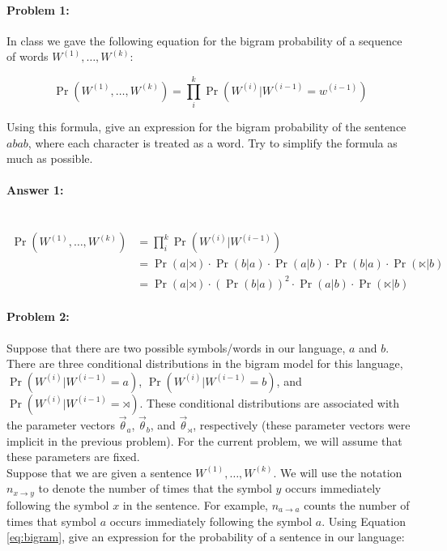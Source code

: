 \documentclass[12pt, letterpaper]{article}
\begin{document}
\pagestyle{fancy}
\paragraph{Problem 1:}
 
In class we gave the following equation for the bigram probability of
a sequence of words $W^{(1)},\dots,W^{(k)}$:

\begin{equation}\label{eq:bigram}
\Pr(W^{(1)},\dots,W^{(k)})=\prod_i^k \Pr(W^{(i)} | W^{(i-1)}=w^{(i-1)})
\end{equation}

\noindent Using this formula, give an expression for the bigram
probability of the sentence $abab$, where each character is treated as
a word. Try to simplify the formula as much as possible.

\paragraph{Answer 1:}~
\begin{align*}
    \Pr(W^{(1)},\dots,W^{(k)})&=\prod_i^k \Pr(W^{(i)} | W^{(i-1)})\\
    &= \Pr(a | \rtimes)\cdot{\Pr(b | a)\cdot{\Pr(a | b)\cdot{\Pr(b | a)\cdot \Pr(\ltimes|b)}}}\\
    &= \Pr(a|\rtimes)\cdot{(\Pr(b|a))^2\cdot{\Pr(a|b)\cdot{\Pr(\ltimes|b)}}}
\end{align*}

\hrulefill
\paragraph{Problem 2:}

Suppose that there are two possible symbols/words in our language, $a$
and $b$. There are three conditional distributions in the bigram model
for this language, $\Pr(W^{(i)} | W^{(i-1)}=a)$,
$\Pr(W^{(i)} | W^{(i-1)}=b)$, and $\Pr(W^{(i)} | W^{(i-1)}=\rtimes)$.
These conditional distributions are associated with the parameter
vectors $\vec{\theta}_{a}$, $\vec{\theta}_{b}$, and
$\vec{\theta}_{\rtimes}$, respectively (these parameter vectors were
implicit in the previous problem). For the current problem, we will
assume that these parameters are fixed.\\

\noindent Suppose that we are given a sentence $W^{(1)},\dots,W^{(k)}$. We will
use the notation $n_{x \rightarrow y}$ to denote the number of times
that the symbol $y$ occurs immediately following the symbol $x$ in the
sentence. For example, $n_{a \rightarrow a}$ counts the number of
times that symbol $a$ occurs immediately following the symbol $a$.
Using Equation \ref{eq:bigram}, give an expression for the probability
of a sentence in our language:
\end{document}
